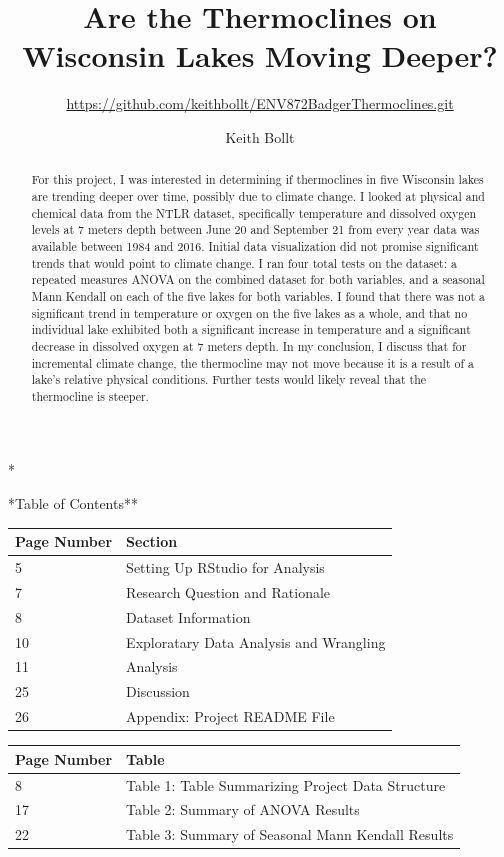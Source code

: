 \documentclass[12pt,]{article}
\title{Are the Thermoclines on Wisconsin Lakes Moving Deeper?}
\subtitle{\url{https://github.com/keithbollt/ENV872BadgerThermoclines.git}}
\author{Keith Bollt}
\date{}
\begin{document}
\maketitle
\begin{abstract}
For this project, I was interested in determining if thermoclines in
five Wisconsin lakes are trending deeper over time, possibly due to
climate change. I looked at physical and chemical data from the NTLR
dataset, specifically temperature and dissolved oxygen levels at 7
meters depth between June 20 and September 21 from every year data was
available between 1984 and 2016. Initial data visualization did not
promise significant trends that would point to climate change. I ran
four total tests on the dataset: a repeated measures ANOVA on the
combined dataset for both variables, and a seasonal Mann Kendall on each
of the five lakes for both variables. I found that there was not a
significant trend in temperature or oxygen on the five lakes as a whole,
and that no individual lake exhibited both a significant increase in
temperature and a significant decrease in dissolved oxygen at 7 meters
depth. In my conclusion, I discuss that for incremental climate change,
the thermocline may not move because it is a result of a lake's relative
physical conditions. Further tests would likely reveal that the
thermocline is steeper.
\end{abstract}

\newpage
*

*Table of Contents**

\begin{longtable}[]{@{}ll@{}}
\toprule
Page Number & Section\tabularnewline
\midrule
\endhead
5 & Setting Up RStudio for Analysis\tabularnewline
7 & Research Question and Rationale\tabularnewline
8 & Dataset Information\tabularnewline
10 & Exploratary Data Analysis and Wrangling\tabularnewline
11 & Analysis\tabularnewline
25 & Discussion\tabularnewline
26 & Appendix: Project README File\tabularnewline
\bottomrule
\end{longtable}

\newpage

\listoftables 

\begin{longtable}[]{@{}ll@{}}
\toprule
Page Number & Table\tabularnewline
\midrule
\endhead
8 & Table 1: Table Summarizing Project Data Structure\tabularnewline
17 & Table 2: Summary of ANOVA Results\tabularnewline
22 & Table 3: Summary of Seasonal Mann Kendall Results\tabularnewline
\bottomrule
\end{longtable}
\end{document}

